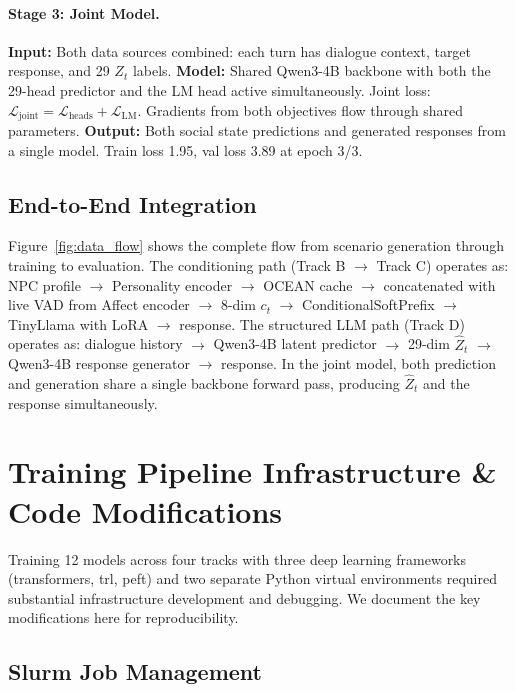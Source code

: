 \documentclass[11pt]{article}
\begin{document}
\paragraph{Stage 3: Joint Model.}
\textbf{Input:} Both data sources combined: each turn has dialogue context, target response, and 29 $Z_t$ labels.
\textbf{Model:} Shared Qwen3-4B backbone with both the 29-head predictor and the LM head active simultaneously.
Joint loss: $\mathcal{L}_\text{joint} = \mathcal{L}_\text{heads} + \mathcal{L}_\text{LM}$.
Gradients from both objectives flow through shared parameters.
\textbf{Output:} Both social state predictions and generated responses from a single model.
Train loss 1.95, val loss 3.89 at epoch 3/3.

\subsection{End-to-End Integration}

Figure~\ref{fig:data_flow} shows the complete flow from scenario generation through training to evaluation.
The conditioning path (Track B $\rightarrow$ Track C) operates as: NPC profile $\rightarrow$ Personality encoder $\rightarrow$ OCEAN cache $\rightarrow$ concatenated with live VAD from Affect encoder $\rightarrow$ 8-dim $c_t$ $\rightarrow$ ConditionalSoftPrefix $\rightarrow$ TinyLlama with LoRA $\rightarrow$ response.
The structured LLM path (Track D) operates as: dialogue history $\rightarrow$ Qwen3-4B latent predictor $\rightarrow$ 29-dim $\hat{Z}_t$ $\rightarrow$ Qwen3-4B response generator $\rightarrow$ response.
In the joint model, both prediction and generation share a single backbone forward pass, producing $\hat{Z}_t$ and the response simultaneously.

\section{Training Pipeline Infrastructure \& Code Modifications}
\label{app:infrastructure}

Training 12 models across four tracks with three deep learning frameworks (transformers, trl, peft) and two separate Python virtual environments required substantial infrastructure development and debugging.
We document the key modifications here for reproducibility.

\subsection{Slurm Job Management}
\end{document}
